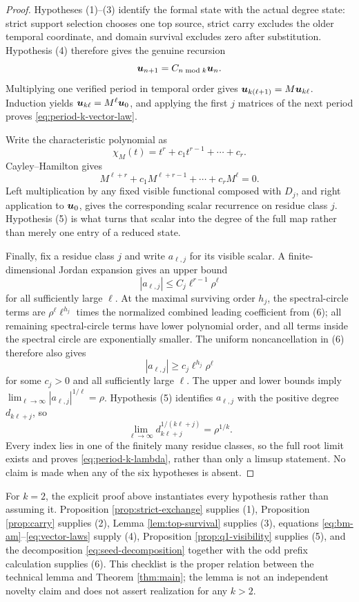 \documentclass[11pt]{article}
\theoremstyle{definition}
\theoremstyle{remark}
\begin{document}
\begin{proof}
Hypotheses (1)--(3) identify the formal state with the actual degree state:
strict support selection chooses one top source, strict carry excludes the
older temporal coordinate, and domain survival excludes zero after
substitution.  Hypothesis (4) therefore gives the genuine recursion
\[
\boldsymbol{u}_{n+1}=C_{n\bmod k}\boldsymbol{u}_n.
\]
Multiplying one verified period in temporal order gives
\(\boldsymbol{u}_{k(\ell+1)}=M\boldsymbol{u}_{k\ell}\).  Induction yields
\(\boldsymbol{u}_{k\ell}=M^\ell\boldsymbol{u}_0\), and applying the first \(j\) matrices of the
next period proves \eqref{eq:period-k-vector-law}.

Write the characteristic polynomial as
\[
\chi_M(t)=t^r+c_1t^{r-1}+\cdots+c_r.
\]
Cayley--Hamilton gives
\[
M^{\ell+r}+c_1M^{\ell+r-1}+\cdots+c_rM^\ell=0.
\]
Left multiplication by any fixed visible functional composed with \(D_j\),
and right application to \(\boldsymbol{u}_0\), gives the corresponding scalar
recurrence on residue class \(j\).  Hypothesis (5) is what turns that scalar
into the degree of the full map rather than merely one entry of a reduced
state.

Finally, fix a residue class \(j\) and write \(a_{\ell,j}\) for its visible
scalar.  A finite-dimensional Jordan expansion gives an upper bound
\[
|a_{\ell,j}|\leq C_j\ell^{r-1}\rho^\ell
\]
for all sufficiently large \(\ell\).  At the maximal surviving order
\(h_j\), the spectral-circle terms are
\(\rho^\ell\ell^{h_j}\) times the normalized combined leading coefficient
from (6); all remaining spectral-circle terms have lower polynomial order,
and all terms inside the spectral circle are exponentially smaller.
The uniform noncancellation in (6) therefore also gives
\[
|a_{\ell,j}|\geq c_j\ell^{h_j}\rho^\ell
\]
for some \(c_j>0\) and all sufficiently large \(\ell\).  The upper and lower
bounds imply \(\lim_{\ell\to\infty}|a_{\ell,j}|^{1/\ell}=\rho\).
Hypothesis (5) identifies \(a_{\ell,j}\) with the positive degree
\(d_{k\ell+j}\), so
\[
\lim_{\ell\to\infty}d_{k\ell+j}^{1/(k\ell+j)}=\rho^{1/k}.
\]
Every index lies in one of the finitely many residue classes, so the full
root limit exists and proves \eqref{eq:period-k-lambda}, rather than only a
limsup statement.  No claim is made when any of the six hypotheses is
absent.
\end{proof}

For \(k=2\), the explicit proof above instantiates every hypothesis rather
than assuming it.  Proposition \ref{prop:strict-exchange} supplies (1),
Proposition \ref{prop:carry} supplies (2), Lemma
\ref{lem:top-survival} supplies (3), equations
\eqref{eq:bm-am}--\eqref{eq:vector-laws} supply (4), Proposition
\ref{prop:q1-visibility} supplies (5), and the decomposition
\eqref{eq:seed-decomposition} together with the odd prefix calculation
supplies (6).  This checklist is the proper relation between the technical
lemma and Theorem \ref{thm:main}; the lemma is not an independent novelty
claim and does not assert realization for any \(k>2\).
\end{document}
